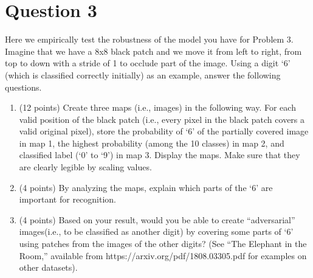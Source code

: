 \documentclass[
	12pt, %
]{../Template/fphw}
\begin{document}

\section*{Question 3}

\begin{problem}
Here we empirically test the robustness of the model you have for Problem 3. Imagine that we
have a 8x8 black patch and we move it from left to right, from top to down with a stride of 1 to occlude part of the
image. Using a digit ‘6’ (which is classified correctly initially) as an example, answer the following questions.
\begin{enumerate}[label=(\arabic*)]
\item (12 points) Create three maps (i.e., images) in the following way. For each valid position of the black patch
(i.e., every pixel in the black patch covers a valid original pixel), store the probability of ‘6’ of the partially
covered image in map 1, the highest probability (among the 10 classes) in map 2, and classified label (‘0’ to
‘9’) in map 3. Display the maps. Make sure that they are clearly legible by scaling values.
\item (4 points) By analyzing the maps, explain which parts of the ‘6’ are important for recognition.
\item (4 points) Based on your result, would you be able to create “adversarial” images(i.e., to be classified as another
digit) by covering some parts of ‘6’ using patches from the images of the other digits? (See “The Elephant in
the Room,” available from https://arxiv.org/pdf/1808.03305.pdf for examples on other datasets). 
\end{enumerate}
\end{problem}

\end{document}
